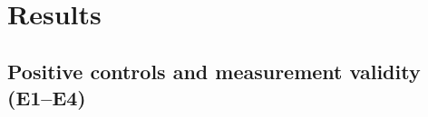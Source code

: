 %




\section{Results}
\label{sec:results}


\subsection{Positive controls and measurement validity (E1--E4)}

